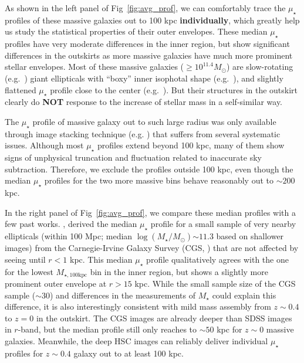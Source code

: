 \documentclass[a4paper,fleqn,usenatbib]{mnras}
\def\mstar{{$M_{\star}$}}
\def\logms{{$\log (M_{\star}/M_{\odot})$}}
\def\mtot{{$M_{\star,100\mathrm{kpc}}$}}
\def\mden{{$\mu_{\star}$}}
\begin{document}
    As shown in the left panel of Fig~\ref{fig:avg_prof}, we can comfortably trace 
    the \mden{} profiles of these massive galaxies out to 100 kpc \textbf{individually}, 
    which greatly help us study the statistical properties of their outer envelopes. 
    These median \mden{} profiles have very moderate differences in the inner region, 
    but show significant differences in the outskirts as more massive galaxies have 
    much more prominent stellar envelopes.
    Most of these massive galaxies ($\ge 10^{11.4} M_{\odot}$) are slow-rotating 
    (e.g.\ \citealt{Cappellari13b}) giant ellipticals with ``boxy'' inner isophotal 
    shape (e.g.\ \citealt{Kormendy2009}), and slightly flattened \mden{} profile close 
    to the center (e.g.\ \citealt{Lauer07}).
    But their structures in the outskirt clearly do \textbf{NOT} response to the 
    increase of stellar mass in a self-similar way.
    
    The \mden{} profile of massive galaxy out to such large radius was only available 
    through image stacking technique (e.g. \citealt{Tal2011, DSouza2015})
    that suffers from several systematic issues.
    Although most \mden{} profiles extend beyond 100 kpc, many of them show signs of 
    unphysical truncation and fluctuation related to inaccurate sky subtraction.  
    Therefore, we exclude the profiles outside 100 kpc, even though the median \mden{} 
    profiles for the two more massive bins behave reasonably out to $\sim 200$ kpc. 
          
    In the right panel of Fig~\ref{fig:avg_prof}, we compare these median profiles with 
    a few past works.  
    \citep{Huang2013a}, derived the median \mden{} profile for a small sample of very 
    nearby ellipticals (within 100 Mpc; median \logms{}$\sim 11.3$ based on shallower 
    images) from the Carnegie-Irvine Galaxy Survey (CGS, \citealt{CGS1}) that are not 
    affected by seeing until $r < 1$ kpc.
    This median \mden{} profile qualitatively agrees with the one for the lowest 
    \mtot{} bin in the inner region, but shows a slightly more prominent outer 
    envelope at $r > 15$ kpc. 
    While the small sample size of the CGS sample ($\sim 30$) and differences in the
    measurements of \mstar{} could explain this difference, it is also interestingly 
    consistent with mild mass assembly from $z\sim 0.4$ to $z=0$ in the outskirt.   
    The CGS images are already deeper than SDSS images in $r$-band, but the median 
    profile still only reaches to $\sim 50$ kpc for $z\sim 0$ massive galaxies.
    Meanwhile, the deep HSC images can reliably deliver individual \mden{} profiles 
    for $z\sim 0.4$ galaxy out to at least 100 kpc.  
    
\end{document}
